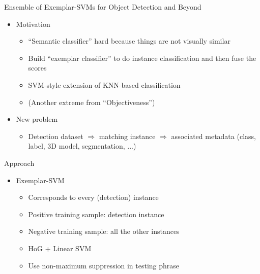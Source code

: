 \documentclass[12pt]{beamer}
\begin{document}
\begin{frame}{Ensemble of Exemplar-SVMs for Object Detection and Beyond}
	\begin{itemize}
		\item Motivation
		\begin{itemize}
			\item ``Semantic classifier'' hard because things are not visually similar
			\item Build ``exemplar classifier'' to do instance classification and then fuse the scores
			\item SVM-style extension of KNN-based classification
            \item (Another extreme from ``Objectiveness'')
		\end{itemize}
		\item New problem
		\begin{itemize}
			\item Detection dataset $\Rightarrow$ matching instance $\Rightarrow$ associated metadata (class, label, 3D model, segmentation, ...)
		\end{itemize}
	\end{itemize}
\end{frame}

\begin{frame}{Approach}
	\begin{itemize}
		\item Exemplar-SVM
		\begin{itemize}
			\item Corresponds to every (detection) instance
			\item Positive training sample: detection instance
			\item Negative training sample: all the other instances
			\item HoG + Linear SVM
			\item Use non-maximum suppression in testing phrase
		\end{itemize}
	\end{itemize}
\end{frame}
\end{document}
